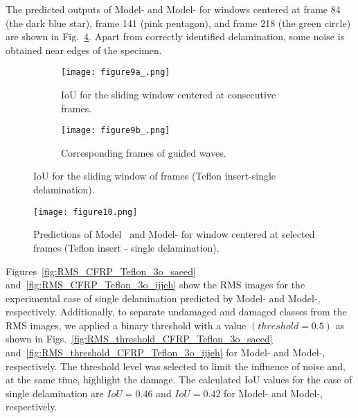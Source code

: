 \begin{sloppypar}
	The predicted outputs of Model- and Model- for windows centered at frame 84 (the dark blue star), frame 141 (pink pentagon), and frame 218 (the green circle) are shown in Fig.~\ref{fig:CFRP_Teflon_3o_predictions}.
	Apart from correctly identified delamination, some noise is obtained near edges of the specimen.
	\begin{figure} [!ht]
		\begin{subfigure}[b]{1\textwidth}
			\centering
			\texttt{[image: figure9a\_.png]}
			\caption{IoU for the sliding window centered at consecutive frames.}
			\label{fig:CFRP_Teflon_3o_IoU_}
		\end{subfigure}
		\par\medskip
		\begin{subfigure}[b]{1\textwidth}
			\centering
			\texttt{[image: figure9b\_.png]}
			\caption{Corresponding frames of guided waves.} 
			\label{fig:CFRP_teflon_3o_shapes_}
		\end{subfigure}
		\caption{IoU for the sliding window of frames (Teflon insert-single delamination).}
		\label{fig:CFRP_Teflon_3o_IoU_centre_window}
	\end{figure} 
	\begin{figure}[!ht]
		\centering
		\texttt{[image: figure10.png]}
		\caption{Predictions of Model~ and Model- for window centered at selected frames (Teflon insert - single delamination).}
		\label{fig:CFRP_Teflon_3o_predictions}
	\end{figure}
	
	Figures~\ref{fig:RMS_CFRP_Teflon_3o_saeed} and~\ref{fig:RMS_CFRP_Teflon_3o_ijjeh} show the RMS images for the experimental case of single delamination predicted by Model- and Model-, respectively.
	Additionally, to separate undamaged and damaged classes from the RMS images, we applied a binary threshold with a value \((threshold=0.5)\) as shown in Figs.~\ref{fig:RMS_threshold_CFRP_Teflon_3o_saeed} and~\ref{fig:RMS_threshold_CFRP_Teflon_3o_ijjeh} for Model- and Model-, respectively. 
	The threshold level was selected to limit the influence of noise and, at the same time, highlight the damage.
	The calculated IoU values for the case of single delamination are \(IoU=0.46\) and \(IoU=0.42\) for Model- and Model-, respectively.
	

\end{sloppypar}
